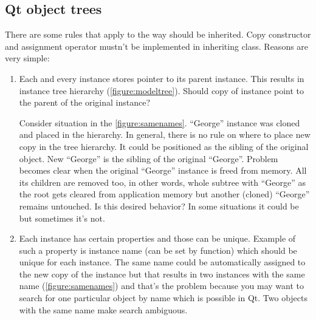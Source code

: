 \subsection{Qt object trees}\label{section:model}
There are some rules that apply to the way should be inherited. Copy constructor and assignment operator mustn't be implemented in inheriting class. Reasons are very simple:
\begin{enumerate}
\item Each and every instance stores pointer to its parent instance. This results in instance tree hierarchy (\autoref{figure:modeltree}). Should copy of instance point to the parent of the original instance?

Consider situation in the \autoref{figure:samenames}. \enquote{George} instance was cloned and placed in the hierarchy. In general, there is no rule on where to place new copy in the tree hierarchy. It could be positioned as the sibling of the original object. New \enquote{George} is the sibling of the original \enquote{George}. Problem becomes clear when the original \enquote{George} instance is freed from memory. All its children are removed too, in other words, whole subtree with \enquote{George} as the root gets cleared from application memory but another (cloned) \enquote{George} remains untouched. Is this desired behavior? In some situations it could be but sometimes it's not.

\item Each instance has certain properties and those can be unique. Example of such a property is instance name (can be set by function) which should be unique for each instance. The same name could be automatically assigned to the new copy of the instance but that results in two instances with the same name (\autoref{figure:samenames}) and that's the problem because you may want to search for one particular object by name which is possible in Qt. Two objects with the same name make search ambiguous.
\end{enumerate}

